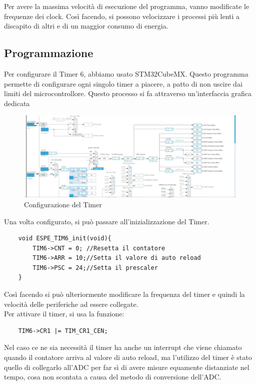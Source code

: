 Per avere la massima velocità di esecuzione del programma, vanno modificate le frequenze dei clock. Così facendo, si possono velocizzare i processi più lenti a discapito di altri e di un maggior consumo di energia.\\

\subsection{Programmazione}
Per configurare il Timer 6, abbiamo usato STM32CubeMX. Questo programma permette di configurare ogni singolo timer a piacere, a patto di non uscire dai limiti del microcontrollore. Questo processo si fa attraverso un'interfaccia grafica dedicata

\begin{figure}
    \centering
    \includegraphics[width=0.7\linewidth]{microcontrollore/assets/clock_config.jpg}
    \caption{Configurazione del Timer}
    \label{fig:Timer}
\end{figure}
 
Una volta configurato, si può passare all'inizializzazione del Timer.

\begin{verbatim}
    void ESPE_TIM6_init(void){
        TIM6->CNT = 0; //Resetta il contatore
        TIM6->ARR = 10;//Setta il valore di auto reload
        TIM6->PSC = 24;//Setta il prescaler
    }
\end{verbatim}

Così facendo si può ulteriormente modificare la frequenza del timer e quindi la velocità delle periferiche ad essere collegate.\\
Per attivare il timer, si usa la funzione:
\begin{verbatim}
    TIM6->CR1 |= TIM_CR1_CEN;
\end{verbatim}

Nel caso ce ne sia necessità il timer ha anche un interrupt che viene chiamato quando il contatore arriva al valore di auto reload, ma l'utilizzo del timer è stato quello di collegarlo all'ADC per far sì di avere misure equamente distanziate nel tempo, cosa non scontata a causa del metodo di conversione dell'ADC.\\